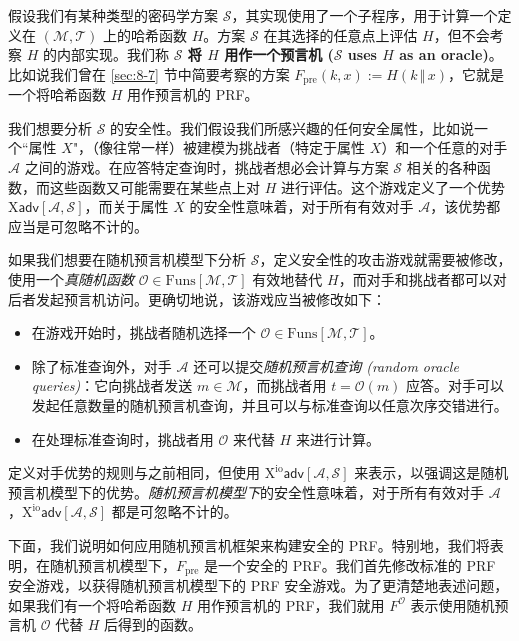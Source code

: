 \begin{snote}[在随机预言机模型下定义安全性。]
假设我们有某种类型的密码学方案 $\mathcal{S}$，其实现使用了一个子程序，用于计算一个定义在 $(\mathcal{M},\mathcal{T})$ 上的哈希函数 $H$。方案 $\mathcal{S}$ 在其选择的任意点上评估 $H$，但不会考察 $H$ 的内部实现。我们称 \textbf{$\mathcal{S}$ 将 $H$ 用作一个预言机 ($\mathcal{S}$ uses $H$ as an oracle)}。比如说我们曾在 \ref{sec:8-7} 节中简要考察的方案 $F_\mathrm{pre}(k,x):=H(k\,\Vert\,x)$，它就是一个将哈希函数 $H$ 用作预言机的 PRF。

我们想要分析 $\mathcal{S}$ 的安全性。我们假设我们所感兴趣的任何安全属性，比如说一个``属性 $X$"，（像往常一样）被建模为挑战者（特定于属性 $X$）和一个任意的对手 $\mathcal{A}$ 之间的游戏。在应答特定查询时，挑战者想必会计算与方案 $\mathcal{S}$ 相关的各种函数，而这些函数又可能需要在某些点上对 $H$ 进行评估。这个游戏定义了一个优势 $\mathrm{X}\mathsf{adv}[\mathcal{A},\mathcal{S}]$，而关于属性 $X$ 的安全性意味着，对于所有有效对手 $\mathcal{A}$，该优势都应当是可忽略不计的。

如果我们想要在随机预言机模型下分析 $\mathcal{S}$，定义安全性的攻击游戏就需要被修改，使用一个\emph{真随机函数} $\mathcal{O}\in\mathrm{Funs}[\mathcal{M},\mathcal{T}]$ 有效地替代 $H$，而对手和挑战者都可以对后者发起预言机访问。更确切地说，该游戏应当被修改如下：
\begin{itemize}
	\item 在游戏开始时，挑战者随机选择一个 $\mathcal{O}\in\mathrm{Funs}[\mathcal{M},\mathcal{T}]$。
	\item 除了标准查询外，对手 $\mathcal{A}$ 还可以提交\emph{随机预言机查询 (random oracle queries)}：它向挑战者发送 $m\in\mathcal{M}$，而挑战者用 $t=\mathcal{O}(m)$ 应答。对手可以发起任意数量的随机预言机查询，并且可以与标准查询以任意次序交错进行。
	\item 在处理标准查询时，挑战者用 $\mathcal{O}$ 来代替 $H$ 来进行计算。
\end{itemize}
定义对手优势的规则与之前相同，但使用 $\mathrm{X}^\mathrm{io}\mathsf{adv}[\mathcal{A},\mathcal{S}]$ 来表示，以强调这是随机预言机模型下的优势。\emph{随机预言机模型下}的安全性意味着，对于所有有效对手 $\mathcal{A}$，$\mathrm{X}^\mathrm{io}\mathsf{adv}[\mathcal{A},\mathcal{S}]$ 都是可忽略不计的。
\end{snote}

\begin{snote}
下面，我们说明如何应用随机预言机框架来构建安全的 PRF。特别地，我们将表明，在随机预言机模型下，$F_\mathrm{pre}$ 是一个安全的 PRF。我们首先修改标准的 PRF 安全游戏，以获得随机预言机模型下的 PRF 安全游戏。为了更清楚地表述问题，如果我们有一个将哈希函数 $H$ 用作预言机的 PRF，我们就用 $F^\mathcal{O}$ 表示使用随机预言机 $\mathcal{O}$ 代替 $H$ 后得到的函数。
\end{snote}

